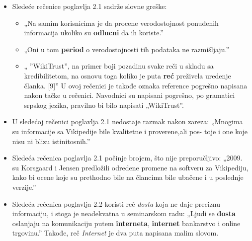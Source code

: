 \documentclass[a4paper]{report}
\begin{document}
\begin{itemize}
    \item Sledeće rečenice poglavlja 2.1 sadrže slovne greške:
    \begin{itemize}
        \item  „Na samim korisnicima je da procene verodostojnost ponuđenih informacija ukoliko su \textbf{odlucni} da ih koriste.”
    \end{itemize}
    \begin{itemize}
        \item  „Oni u tom \textbf{period} o verodostojnosti tih podataka ne razmišljaju.”
    \end{itemize}
    \begin{itemize}
        \item  „ ”WikiTrust”, na primer boji pozadinu
svake reči u skladu sa kredibilitetom, na osnovu toga koliko je puta \textbf{reć} preživela uredenje članka. [9]”\newline
U ovoj rečenici je takođe oznaka reference pogrešno napisana nakon tačke u rečenici. Navodnici su napisani pogrešno, po gramatici srpskog jezika, pravilno bi bilo napisati „WikiTrust”.
    \end{itemize}
\end{itemize}
\begin{itemize}
    \item U sledećoj rečenici poglavlja 2.1 nedostaje razmak nakon zareza:\newline
    „Mnogima su informacije sa Vikipedije bile kvalitetne i proverene,ali pos-
toje i one koje nisu ni blizu istinitosnih.”
\end{itemize}
\begin{itemize}
    \item Sledeća rečenica poglavlja 2.1 počinje brojem, što nije preporučljivo: \newline
    „2009. su Korsgaard i Jensen
predložili odredene promene na softveru za Vikipediju, kako bi ocene koje
su prethodno bile na člancima bile ubačene i u poslednje verzije.”
\end{itemize}
\begin{itemize}
    \item Sledeća rečenica poglavlja 2.2 koristi reč \textit{dosta} koja ne daje preciznu informaciju, i stoga je neadekvatna u seminarskom radu:\newline
    „Ljudi se \textbf{dosta} oslanjaju na komunikaciju putem \textbf{interneta}, \textbf{internet} bankarstvo
i online trgovinu.”\newline
Takođe, reč \textit{Internet} je dva puta napisana malim slovom.
\end{itemize}
\end{document}
